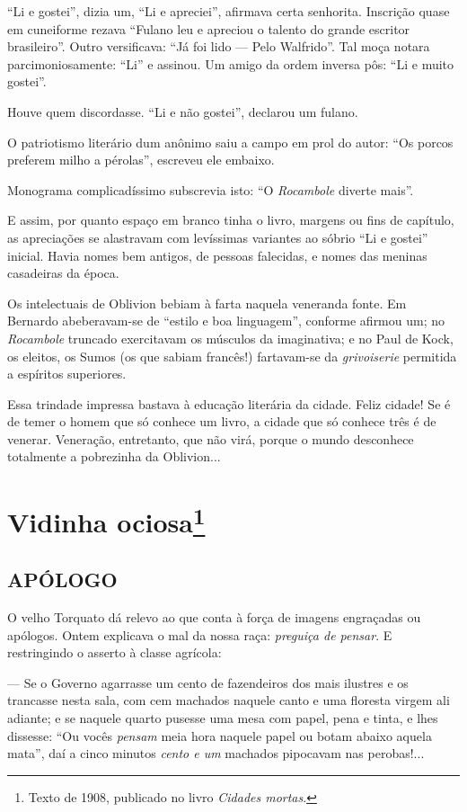 ``Li e gostei'', dizia um, ``Li e apreciei'', afirmava certa senhorita.
Inscrição quase em cuneiforme rezava ``Fulano leu e apreciou o talento
do grande escritor brasileiro''. Outro versificava: ``Já foi lido ---
Pelo Walfrido''. Tal moça notara parcimoniosamente: ``Li'' e assinou. Um
amigo da ordem inversa pôs: ``Li e muito gostei''.

Houve quem discordasse. ``Li e não gostei'', declarou um fulano.

O patriotismo literário dum anônimo saiu a campo em prol do autor: ``Os
porcos preferem milho a pérolas'', escreveu ele embaixo.

Monograma complicadíssimo subscrevia isto: ``O \emph{Rocambole} diverte
mais''.

E assim, por quanto espaço em branco tinha o livro, margens ou fins de
capítulo, as apreciações se alastravam com levíssimas variantes ao
sóbrio ``Li e gostei'' inicial. Havia nomes bem antigos, de pessoas
falecidas, e nomes das meninas casadeiras da época.

Os intelectuais de Oblivion bebiam à farta naquela veneranda fonte. Em
Bernardo abeberavam-se de ``estilo e boa linguagem'', conforme afirmou
um; no \emph{Rocambole} truncado exercitavam os músculos da imaginativa;
e no Paul de Kock, os eleitos, os Sumos (os que sabiam francês!)
fartavam-se da \emph{grivoiserie} permitida a espíritos superiores.

Essa trindade impressa bastava à educação literária da cidade. Feliz
cidade! Se é de temer o homem que só conhece um livro, a cidade que só
conhece três é de venerar. Veneração, entretanto, que não virá, porque o
mundo desconhece totalmente a pobrezinha da Oblivion...

\chapter{Vidinha ociosa\footnote[*]{Texto de 1908, publicado no livro \emph{Cidades mortas}.}}

\section{APÓLOGO}

O velho Torquato dá relevo ao que conta à força de imagens engraçadas ou
apólogos. Ontem explicava o mal da nossa raça: \emph{preguiça de
pensar}. E restringindo o asserto à classe agrícola:

--- Se o Governo agarrasse um cento de fazendeiros dos mais ilustres e
os trancasse nesta sala, com cem machados naquele canto e uma floresta
virgem ali adiante; e se naquele quarto pusesse uma mesa com papel, pena
e tinta, e lhes dissesse: ``Ou vocês \emph{pensam} meia hora naquele
papel ou botam abaixo aquela mata'', daí a cinco minutos \emph{cento e
um} machados pipocavam nas perobas!...

